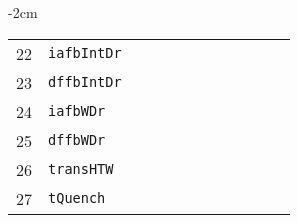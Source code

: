 \begin{table*}[!htbp]
\begin{adjustwidth*}{}{-2cm}
\begin{tabular}{@{}rlrrrrrrrrrc@{}}
\footnotesize{22}  & \footnotesize{\texttt{iafbIntDr}}  &          &          &          &          &     &     & &          &     &     \\
\footnotesize{23}  & \footnotesize{\texttt{dffbIntDr}}  &          &          &          &          &     &     & &          &     &     \\
\footnotesize{24}  & \footnotesize{\texttt{iafbWDr}}    &          &          &          &          &     &     & &          &     &     \\
\footnotesize{25}  & \footnotesize{\texttt{dffbWDr}}    &          &          &          &          &     &     & &          &     &     \\
\footnotesize{26}  & \footnotesize{\texttt{transHTW}}   &          &          &          &          &     &     & &          &     &     \\
\footnotesize{27}  & \footnotesize{\texttt{tQuench}}    &          &          &          &          &     &     & &          &     &     \\
\bottomrule
\end{tabular}
\end{adjustwidth*}
\end{table*}

